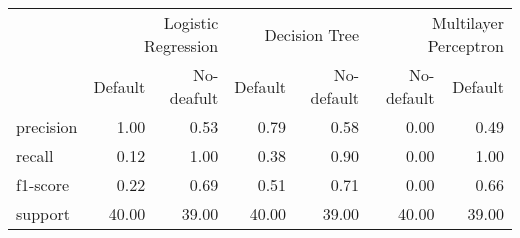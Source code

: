 \begin{table}
\thcenter
\begin{tabular}{lrrrrrr}
 & \multicolumn{2}{r}{Logistic Regression} & \multicolumn{2}{r}{Decision Tree  } & \multicolumn{2}{r}{Multilayer Perceptron} \\
 & Default & No-deafult & Default & No-default & No-default & Default \\
precision & 1.00 & 0.53 & 0.79 & 0.58 & 0.00 & 0.49 \\
recall & 0.12 & 1.00 & 0.38 & 0.90 & 0.00 & 1.00 \\
f1-score & 0.22 & 0.69 & 0.51 & 0.71 & 0.00 & 0.66 \\
support & 40.00 & 39.00 & 40.00 & 39.00 & 40.00 & 39.00 \\
\end{tabular}
\end{table}
